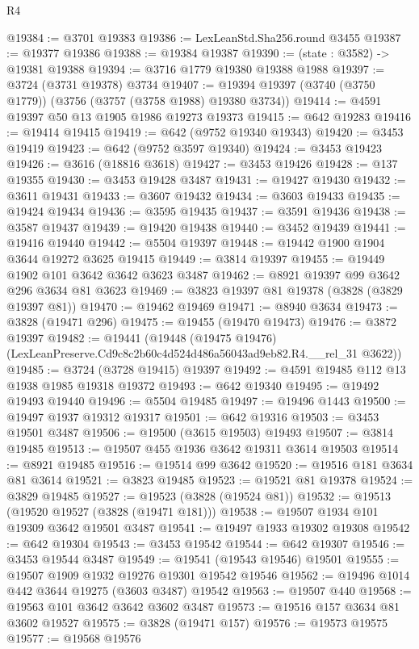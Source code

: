 \begin{lexlean}{R4}
\begin{coremodule}
@19384 := @3701 @19383
@19386 := LexLeanStd.Sha256.round @3455
@19387 := @19377 @19386
@19388 := @19384 @19387
@19390 := (state : @3582) -> @19381 @19388
@19394 := @3716 @1779 @19380 @19388 @1988
@19397 := @3724 (@3731 @19378) @3734
@19407 := @19394 @19397 (@3740 (@3750 @1779)) (@3756 (@3757 (@3758 @1988) @19380 @3734))
@19414 := @4591 @19397 @50 @13 @1905 @1986 @19273 @19373
@19415 := @642 @19283
@19416 := @19414 @19415
@19419 := @642 (@9752 @19340 @19343)
@19420 := @3453 @19419
@19423 := @642 (@9752 @3597 @19340)
@19424 := @3453 @19423
@19426 := @3616 (@18816 @3618)
@19427 := @3453 @19426
@19428 := @137 @19355
@19430 := @3453 @19428 @3487
@19431 := @19427 @19430
@19432 := @3611 @19431
@19433 := @3607 @19432
@19434 := @3603 @19433
@19435 := @19424 @19434
@19436 := @3595 @19435
@19437 := @3591 @19436
@19438 := @3587 @19437
@19439 := @19420 @19438
@19440 := @3452 @19439
@19441 := @19416 @19440
@19442 := @5504 @19397
@19448 := @19442 @1900 @1904 @3644 @19272 @3625 @19415
@19449 := @3814 @19397
@19455 := @19449 @1902 @101 @3642 @3642 @3623 @3487
@19462 := @8921 @19397 @99 @3642 @296 @3634 @81 @3623
@19469 := @3823 @19397 @81 @19378 (@3828 (@3829 @19397 @81))
@19470 := @19462 @19469
@19471 := @8940 @3634
@19473 := @3828 (@19471 @296)
@19475 := @19455 (@19470 @19473)
@19476 := @3872 @19397
@19482 := @19441
    (@19448 (@19475 @19476) (LexLeanPreserve.Cd9c8c2b60c4d524d486a56043ad9eb82.R4.__rel_31 @3622))
@19485 := @3724 (@3728 @19415) @19397
@19492 := @4591 @19485 @112 @13 @1938 @1985 @19318 @19372
@19493 := @642 @19340
@19495 := @19492 @19493 @19440
@19496 := @5504 @19485
@19497 := @19496 @1443
@19500 := @19497 @1937 @19312 @19317
@19501 := @642 @19316
@19503 := @3453 @19501 @3487
@19506 := @19500 (@3615 @19503) @19493
@19507 := @3814 @19485
@19513 := @19507 @455 @1936 @3642 @19311 @3614 @19503
@19514 := @8921 @19485
@19516 := @19514 @99 @3642
@19520 := @19516 @181 @3634 @81 @3614
@19521 := @3823 @19485
@19523 := @19521 @81 @19378
@19524 := @3829 @19485
@19527 := @19523 (@3828 (@19524 @81))
@19532 := @19513 (@19520 @19527 (@3828 (@19471 @181)))
@19538 := @19507 @1934 @101 @19309 @3642 @19501 @3487
@19541 := @19497 @1933 @19302 @19308
@19542 := @642 @19304
@19543 := @3453 @19542
@19544 := @642 @19307
@19546 := @3453 @19544 @3487
@19549 := @19541 (@19543 @19546) @19501
@19555 := @19507 @1909 @1932 @19276 @19301 @19542 @19546
@19562 := @19496 @1014 @442 @3644 @19275 (@3603 @3487) @19542
@19563 := @19507 @440
@19568 := @19563 @101 @3642 @3642 @3602 @3487
@19573 := @19516 @157 @3634 @81 @3602 @19527
@19575 := @3828 (@19471 @157)
@19576 := @19573 @19575
@19577 := @19568 @19576

\end{coremodule}
\end{lexlean}
